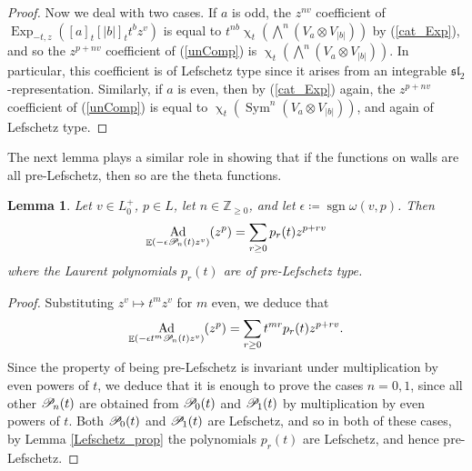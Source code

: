 \documentclass{amsart}
\DeclareMathOperator{\pl}{\mathscr{P}\!}
\DeclareMathOperator{\CSym}{Sym}
\DeclareMathOperator{\sign}{sgn}
\DeclareMathOperator{\EE}{\mathbb{E}}
\DeclareMathOperator{\Ad}{Ad}
\DeclareMathOperator{\Exp}{Exp}
\def\!{\mskip-\thinmuskip}
\renewcommand{\chi}{\upchi}
\theoremstyle{plain}%
\newtheorem{lem}[thm]{Lemma}
\theoremstyle{definition}
\theoremstyle{remark}
\begin{document}
\begin{proof}
Now we deal with two cases.  If $a$ is odd, the $z^{nv}$ coefficient of $\Exp_{-t,z}([a]_t[|b|]_tt^bz^v)$ is equal to $t^{nb}\chi_{t}(\bigwedge^n(V_a\otimes V_{|b|}))$ by (\ref{cat_Exp}), and so the $z^{p+nv}$ coefficient of (\ref{unComp}) is $\chi_{t}(\bigwedge^n(V_a\otimes V_{|b|}))$.  In particular, this coefficient is of Lefschetz type since it arises from an integrable $\mathfrak{sl}_2$-representation.  Similarly, if $a$ is even, then by (\ref{cat_Exp}) again, the $z^{p+nv}$ coefficient of (\ref{unComp}) is equal to $\chi_{t}(\CSym^n(V_a\otimes V_{|b|}))$, and again of Lefschetz type.
\end{proof}

The next lemma plays a similar role in showing that if the functions on walls are all pre-Lefschetz, then so are the theta functions.
\begin{lem}
\label{pL_prop}
Let $v\in L_0^+$, $p\in L$, let $n\in \mathbb{Z}_{
\geq 0}$, and let $\epsilon\coloneqq \sign\omega(v,p)$.  Then 
\[
\Ad_{\EE\left(-\epsilon\!\pl_n(t)z^v\right)}(z^p)=\sum_{r\geq 0} p_r(t)z^{p+rv}
\]
where the Laurent polynomials $p_r(t)$ are of pre-Lefschetz type.
\end{lem}
\begin{proof}
Substituting $z^v\mapsto t^mz^v$ for $m$ even, we deduce that 
\[
\Ad_{\EE\left(-\epsilon t^m\!\pl_n(t)z^v\right)}(z^p)=\sum_{r\geq 0} t^{mr}p_r(t)z^{p+rv}.
\]
Since the property of being pre-Lefschetz is invariant under multiplication by even powers of $t$, we deduce that it is enough to prove the cases $n=0,1$, since all other $\pl_n(t)$ are obtained from $\pl_0(t)$ and $\pl_1(t)$ by multiplication by even powers  of $t$.  Both $\pl_0(t)$ and $\pl_1(t)$ are Lefschetz, and so in both of these cases, by Lemma \ref{Lefschetz_prop} the polynomials $p_r(t)$ are Lefschetz, and hence pre-Lefschetz.
\end{proof}
\end{document}
